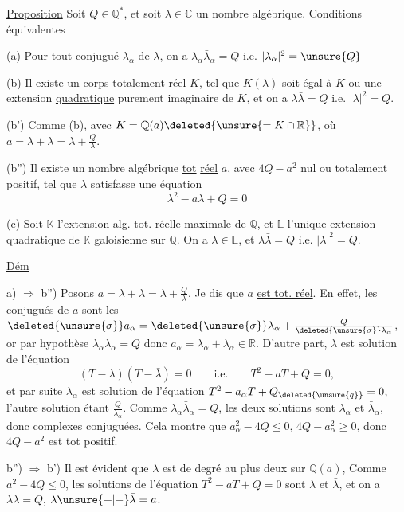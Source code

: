 \uline{Proposition} Soit $Q\in\mathbb Q^*$, et soit $\lambda\in\mathbb C$ un nombre algébrique.
Conditions équivalentes

(a) Pour tout conjugué $\lambda_\alpha$ de $\lambda$, on a $\lambda_\alpha\bar\lambda_\alpha=Q$ i.e. $|\lambda_\alpha|^2=\unsure{Q}$

(b)  Il existe un corps  \uline{totalement réel} $K$, tel que
 $K(\lambda)$ soit égal à $K$ ou une extension \uline{quadratique} purement
imaginaire de $K$, et on a $\lambda\bar\lambda=Q$ i.e. $|\lambda|^2=Q$.

(b') Comme (b), avec $K=\mathbb Q(a)\deleted{\unsure{=K\cap\mathbb R}}$, où $a=\lambda+\bar\lambda=\lambda+\frac Q\lambda$.

(b'') Il existe un nombre algébrique  \uline{tot} \uline{réel} $a$,
avec  $4Q-a^2$ nul ou totalement
positif, tel que $\lambda$ satisfasse une équation
\[
\lambda^2-a\lambda+Q=0
\]

(c) Soit $\mathbb K$ l'extension alg. tot. réelle maximale de $\mathbb Q$, et
$\mathbb L$ l'unique extension quadratique de $\mathbb K$ galoisienne sur $\mathbb Q$.
On a $\lambda\in\mathbb L$, et \deleted{$\unsure{|\lambda|}$} $\lambda\bar\lambda=Q$ i.e. $|\lambda|^2=Q$.

\uline{Dém}

a) $\Longrightarrow$ b'') Posons $a=\lambda+\bar\lambda=\lambda+\frac Q\lambda$. Je dis que $a$ \uline{est tot. réel}.
En effet, les conjugués de $a$ sont les $\deleted{\unsure{\sigma}}a_\alpha=\deleted{\unsure{\sigma}}\lambda_\alpha+\frac{Q}{\deleted{\unsure{\sigma}}\lambda_\alpha}$, or
par hypothèse $\lambda_\alpha\bar\lambda_\alpha=Q$ donc $a_\alpha=\lambda_\alpha+\bar\lambda_\alpha\in\mathbb R$. D'autre part,
$\lambda$ est solution de l'équation
\[
(T-\lambda)(T-\bar\lambda)=0\qquad\text{i.e.}\qquad T^2-aT+Q=0,
\]
et par suite $\lambda_\alpha$ est solution de l'équation $T^2-a_\alpha T+Q_{\deleted{\unsure{q}}}=0$,
 l'autre solution étant $\frac Q{\lambda_\alpha}$.  Comme
$\lambda_\alpha\bar\lambda_\alpha=Q$, les deux solutions sont $\lambda_\alpha$ et $\bar\lambda_\alpha$, donc complexes
conjuguées. Cela montre que $a_\alpha^2-4Q\le0$,  
$4Q-a_\alpha^2\ge0$, donc $4Q-a^2$ est tot positif.

b'') $\Longrightarrow$ b') Il est évident que $\lambda$ est de degré au plus
deux sur  $\mathbb Q(a)$,  
 Comme $a^2-4Q\le0$, les solutions de l'équation
$T^2-aT+Q=0$ sont $\lambda$ et $\bar\lambda$, et on a $\lambda\bar\lambda=Q$, $\lambda\unsure{+|-}\bar\lambda=a$.
